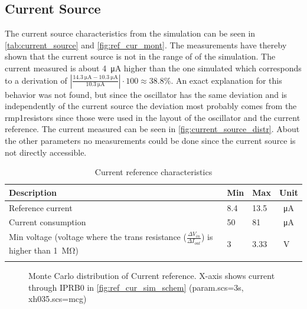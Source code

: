 \subsection{Current Source}
\label{subsubsec:current_source}
The current source characteristics from the simulation can be seen in \autoref{tab:current_source} and \autoref{fig:ref_cur_mont}. The measurements have thereby shown that the current source is not in the range of of the simulation. The current measured is about \qty{4}{\micro\ampere} higher than the one simulated which corresponds to a derivation of $\left|\frac{\qty{14.3}{\micro\ampere}-\qty{10.3}{\micro\ampere}}{\qty{10.3}{\micro\ampere}}\right|\cdot 100\approx 38.8 \%$. An exact explanation for this behavior was not found, but since the oscillator has the same deviation and is independently of the current source the deviation most probably comes from the \glqq rmp1\grqq resistors since those were used in the layout of the oscillator and the current reference.
The current measured can be seen in \autoref{fig:current_source_distr}. About the other parameters no measurements could be done since the current source is not directly accessible.
\begin{longtable}{|p{3.5cm}|p{3.5cm}|p{3.5cm}|p{3.5cm}|}
	\hline
	\rowcolor{lightgray}
	\textbf{Description} &\textbf{Min} &\textbf{Max} & \textbf{Unit} \\ \hline
	
	Reference current & 8.4 & 13.5 &\qty{}{\micro\ampere} \\ \hline
	Current consumption & 50 & 81 & \qty{}{\micro\ampere} \\ \hline
	Min voltage (voltage where the trans resistance ($\frac{\Delta V_{in}}{\Delta I_{out}}$) is higher than \qty{1}{\mega\ohm}) & 3& 3.33 & \qty{}{\volt} \\ \hline
	\caption{Current reference characteristics} %
	\label{tab:current_source}
\end{longtable}
\begin{figure}[ht]
	\centering
	\caption{Monte Carlo distribution of Current reference. X-axis shows current through \glqq IPRB0\grqq{} in \autoref{fig:ref_cur_sim_schem} (param.scs=3s, xh035.scs=mcg)}
	\label{fig:ref_cur_mont}
\end{figure}
